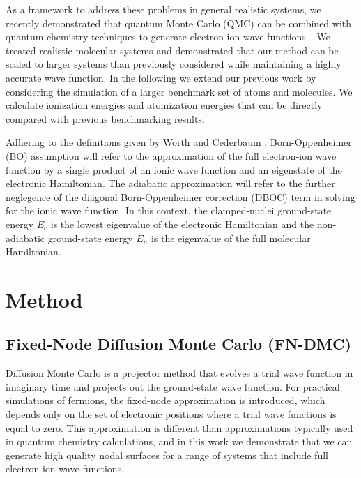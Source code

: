 \documentclass[pra,superscriptaddress,groupedaddress,twocolumn]{revtex4}
\begin{document}
As a framework to address these problems in general realistic systems, we recently demonstrated that quantum Monte Carlo (QMC) can be combined with quantum chemistry techniques to generate electron-ion wave functions~\cite{Tubman_ECG}.  We treated realistic molecular systems and demonstrated that our method can be scaled to larger systems than previously considered while maintaining a highly accurate wave function. In the following we extend our previous work by considering the simulation of a larger benchmark set of atoms and molecules.  We calculate ionization energies and atomization energies that can be directly compared with previous benchmarking results.

Adhering to the definitions given by Worth and Cederbaum \cite{Cederbaum_Review},
Born-Oppenheimer (BO) assumption will refer to the approximation of the full electron-ion wave function by a single product of an ionic wave function and an eigenstate of the electronic Hamiltonian. The adiabatic approximation will refer to the further neglegence of the diagonal Born-Oppenheimer correction (DBOC) term in solving for the ionic wave function. In this context, the clamped-nuclei ground-state energy $E_c$ is the lowest eigenvalue of the electronic Hamiltonian and the non-adiabatic ground-state energy $E_n$ is the eigenvalue of the full molecular Hamiltonian. %

\section{Method}
\subsection{Fixed-Node Diffusion Monte Carlo (FN-DMC)}
Diffusion Monte Carlo is a projector method that evolves a trial wave function in imaginary time and projects out the ground-state wave function.  For practical simulations of fermions, the fixed-node approximation is introduced, which depends only on the set of electronic positions where a trial wave functions is equal to zero.  This approximation is different than approximations typically used in quantum chemistry calculations, and in this work we demonstrate that we can generate high quality nodal surfaces for a range of systems that include full electron-ion wave functions. 
\end{document}
